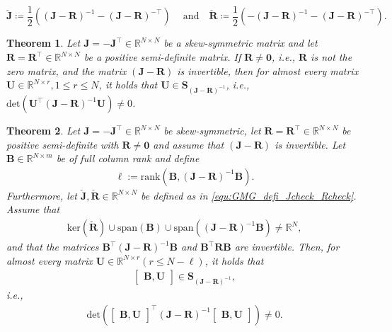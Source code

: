 \documentclass[10pt,a4paper]{amsart}
\newtheorem{theorem}{Theorem}
\newcommand{\FOMsize}{N}
\newcommand{\Jcheck}{\check{\bmJ}}
\newcommand{\R}{\mathbb{R}}
\newcommand{\ROMsize}{r}
\newcommand{\Rcheck}{\check{\bmR}}
\newcommand{\bmB}{\bm{B}}
\newcommand{\bmJ}{\bm{J}}
\newcommand{\bmR}{\bm{R}}
\newcommand{\bmU}{\bm{U}}
\newcommand{\bzero}{\mathbf{0}}
\newcommand{\matset}{\mathbf{S}}
\newcommand{\portsize}{m}
\begin{document}
\begin{equation}
		\label{equ:GMG_defi_Jcheck_Rcheck}
				\Jcheck \coloneq \frac{1}{2}\left((\bmJ-\bmR)^{-1} - (\bmJ-\bmR)^{-\top}\right)\ \quad \mathrm{and}\quad\Rcheck \coloneq
				\frac{1}{2} \left(-(\bmJ-\bmR)^{-1} -(\bmJ-\bmR)^{-\top}\right).
			\end{equation}

\begin{theorem}
\label{Theo:exists_JR_inv}
			Let $\bmJ=-\bmJ^{\top}\in\R^{\FOMsize\times \FOMsize}$ be a skew-symmetric matrix and let $\bmR=\bmR^{\top}\in\R^{\FOMsize\times\FOMsize}$ be a positive semi-definite matrix. If $\bmR\neq\bzero$, i.e., $\bmR$ is not the zero matrix, and the matrix $(\bmJ-\bmR)$ is invertible, then for almost every matrix $\bmU\in \R^{\FOMsize\times\ROMsize}, 1\leq\ROMsize\leq\FOMsize$, it holds that $\bmU\in\matset_{(\bmJ-\bmR)^{-1}}$, i.e., $\mathrm{det}\left(\bmU^{\top}(\bmJ-\bmR)^{-1}\bmU\right)\neq 0$.
\end{theorem}	

\begin{theorem}
\label{Theo:exists_JR_inv_BVbar}
Let $\bmJ=-\bmJ^{\top}\in\R^{\FOMsize\times \FOMsize}$ be skew-symmetric, let $\bmR=\bmR^{\top} \in\R^{\FOMsize\times\FOMsize}$ be positive semi-definite with $\bmR \neq \bm{0}$ and assume that $(\bmJ-\bmR)$ is invertible. Let $\bmB\in\R^{\FOMsize\times\portsize}$ be of full column rank and define 
\begin{align*}
	\ell := \mathrm{rank}\left(\bmB, (\bmJ-\bmR)^{-1}\bmB \right).
\end{align*}
Furthermore, let $\Jcheck,\Rcheck \in \R^{\FOMsize \times \FOMsize}$ be defined as in \eqref{equ:GMG_defi_Jcheck_Rcheck}. Assume that 
\begin{align} \label{eq:full_space_assumption}
			 \mathrm{ker}(\Rcheck)\cup
			 \mathrm{span}(\bmB)\cup
			 \mathrm{span}((\bmJ-\bmR)^{-1}\bmB)
			 \neq
			 \R^{\FOMsize},
\end{align}			 
and that the matrices $\bmB^{\top}(\bmJ-\bmR)^{-1}\bmB$ and $\bmB^{\top}\bmR\bmB$ are invertible. Then, for almost every matrix $\bmU\in \R^{\FOMsize\times\ROMsize} (\ROMsize\leq\FOMsize-\ell)$, it holds that 
\begin{align*}
	\begin{bmatrix}
				\bmB,\bmU
			\end{bmatrix}\in\matset_{(\bmJ-\bmR)^{-1}},
\end{align*}
i.e., 
\begin{align*}
\mathrm{det}\left(\begin{bmatrix}
				\bmB,\bmU
			\end{bmatrix}^{\top}(\bmJ-\bmR)^{-1}\begin{bmatrix}
				\bmB,\bmU
			\end{bmatrix}\right)\neq 0.
\end{align*}
\end{theorem}
\end{document}
